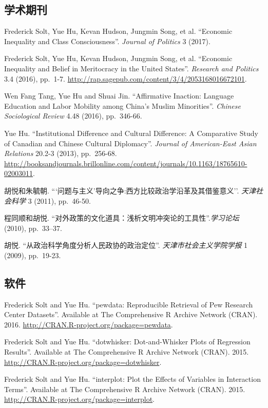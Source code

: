 \documentclass[10.5pt,]{article}
\begin{document}
\subsection{学术期刊}

Frederick Solt, Yue Hu, Kevan Hudson, Jungmin Song, et al. ``Economic
Inequality and Class Consciousness''. \emph{Journal of Politics} 3
(2017).

Frederick Solt, Yue Hu, Kevan Hudson, Jungmin Song, et al. ``Economic
Inequality and Belief in Meritocracy in the United States''.
\emph{Research and Politics} 3.4 (2016), pp.~1-7.
\url{http://rap.sagepub.com/content/3/4/2053168016672101}.

Wen Fang Tang, Yue Hu and Shuai Jin. ``Affirmative Inaction: Language
Education and Labor Mobility among China's Muslim Minorities''.
\emph{Chinese Sociological Review} 4.48 (2016), pp.~346-66.

Yue Hu. ``Institutional Difference and Cultural Difference: A
Comparative Study of Canadian and Chinese Cultural Diplomacy''.
\emph{Journal of American-East Asian Relations} 20.2-3 (2013),
pp.~256-68.
\url{http://booksandjournals.brillonline.com/content/journals/10.1163/18765610-02003011}.

胡悦和朱毓朝. ```问题与主义'导向之争:西方比较政治学沿革及其借鉴意义''. 
\emph{天津社会科学} 3 (2011), pp.~46-50.

程同顺和胡悦. ``对外政策的文化道具：浅析文明冲突论的工具性''.\emph{学习论坛} (2010), pp.~33--37.

胡悦. ``从政治科学角度分析人民政协的政治定位''.
\emph{天津市社会主义学院学报} 1 (2009), pp.~19-23.

\subsection{软件}

Frederick Solt and Yue Hu. ``pewdata: Reproducible Retrieval of Pew
Research Center Datasets''. Available at The Comprehensive R Archive
Network (CRAN). 2016. \url{http://CRAN.R-project.org/package=pewdata}.

Frederick Solt and Yue Hu. ``dotwhisker: Dot-and-Whisker Plots of
Regression Results''. Available at The Comprehensive R Archive Network
(CRAN). 2015. \url{http://CRAN.R-project.org/package=dotwhisker}.

Frederick Solt and Yue Hu. ``interplot: Plot the Effects of Variables in
Interaction Terms''. Available at The Comprehensive R Archive Network
(CRAN). 2015. \url{http://CRAN.R-project.org/package=interplot}.
\end{document}
